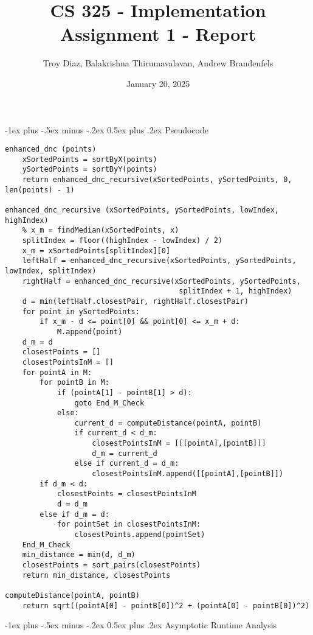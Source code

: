 \documentclass{article}
\title{CS 325 - Implementation Assignment 1 - Report}
\author{Troy Diaz, Balakrishna Thirumavalavan, Andrew Brandenfels}
\date{January 20, 2025}
\makeatletter
\renewcommand{\section}{\@startsection{section}{1}{0mm}%
                                {-1ex plus -.5ex minus -.2ex}%
                                {0.5ex plus .2ex}%
                                {\normalfont\large\bfseries}}
\makeatother
\begin{document}
\maketitle
\section{Pseudocode}
\begin{verbatim}
enhanced_dnc (points)
    xSortedPoints = sortByX(points)
    ySortedPoints = sortByY(points)
    return enhanced_dnc_recursive(xSortedPoints, ySortedPoints, 0, len(points) - 1)

enhanced_dnc_recursive (xSortedPoints, ySortedPoints, lowIndex, highIndex)
    % x_m = findMedian(xSortedPoints, x)
    splitIndex = floor((highIndex - lowIndex) / 2)
    x_m = xSortedPoints[splitIndex][0]
    leftHalf = enhanced_dnc_recursive(xSortedPoints, ySortedPoints, lowIndex, splitIndex)
    rightHalf = enhanced_dnc_recursive(xSortedPoints, ySortedPoints, 
                                        splitIndex + 1, highIndex)
    d = min(leftHalf.closestPair, rightHalf.closestPair)
    for point in ySortedPoints:
        if x_m - d <= point[0] && point[0] <= x_m + d:
            M.append(point)
    d_m = d
    closestPoints = []
    closestPointsInM = []
    for pointA in M:
        for pointB in M:
            if (pointA[1] - pointB[1] > d):
                goto End_M_Check
            else:
                current_d = computeDistance(pointA, pointB)
                if current_d < d_m:
                    closestPointsInM = [[[pointA],[pointB]]]
                    d_m = current_d
                else if current_d = d_m:
                    closestPointsInM.append([[pointA],[pointB]])
        if d_m < d:
            closestPoints = closestPointsInM
            d = d_m
        else if d_m = d:
            for pointSet in closestPointsInM:
                closestPoints.append(pointSet)
    End_M_Check
    min_distance = min(d, d_m)
    closestPoints = sort_pairs(closestPoints)
    return min_distance, closestPoints

computeDistance(pointA, pointB)
    return sqrt((pointA[0] - pointB[0])^2 + (pointA[0] - pointB[0])^2)

\end{verbatim}
\section{Asymptotic Runtime Analysis}
\end{document}
